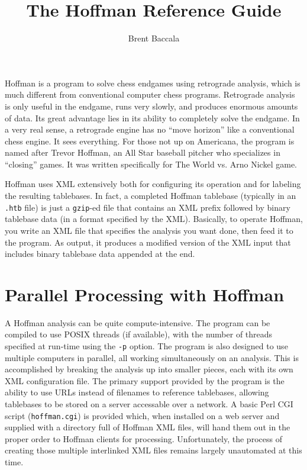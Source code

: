 \documentclass[11pt]{article}
\title{The Hoffman Reference Guide}
\author{Brent Baccala}
\begin{document}
\maketitle

\parindent 0pt
\parskip 12pt

Hoffman is a program to solve chess endgames using retrograde
analysis, which is much different from conventional computer chess
programs.  Retrograde analysis is only useful in the endgame, runs
very slowly, and produces enormous amounts of data.  Its great
advantage lies in its ability to completely solve the endgame.  In a
very real sense, a retrograde engine has no ``move horizon'' like a
conventional chess engine.  It sees everything.  For those not up on
Americana, the program is named after Trevor Hoffman, an All Star
baseball pitcher who specializes in ``closing'' games.  It was written
specifically for The World vs. Arno Nickel game.

Hoffman uses XML extensively both for configuring its operation and
for labeling the resulting tablebases.  In fact, a completed Hoffman
tablebase (typically in an {\tt .htb} file) is just a {\tt gzip}-ed
file that contains an XML prefix followed by binary tablebase data (in
a format specified by the XML).  Basically, to operate Hoffman, you
write an XML file that specifies the analysis you want done, then feed
it to the program.  As output, it produces a modified version of the
XML input that includes binary tablebase data appended at the end.

\section{Parallel Processing with Hoffman}

A Hoffman analysis can be quite compute-intensive.  The program can be
compiled to use POSIX threads (if available), with the number of
threads specified at run-time using the {\tt -p} option.  The program
is also designed to use multiple computers in parallel, all working
simultaneously on an analysis.  This is accomplished by breaking the
analysis up into smaller pieces, each with its own XML configuration
file.  The primary support provided by the program is the ability to
use URLs instead of filenames to reference tablebases, allowing
tablebases to be stored on a server accessable over a network.  A
basic Perl CGI script ({\tt hoffman.cgi}) is provided which, when
installed on a web server and supplied with a directory full of
Hoffman XML files, will hand them out in the proper order to Hoffman
clients for processing.  Unfortunately, the process of creating those
multiple interlinked XML files remains largely unautomated at this
time.
\end{document}

